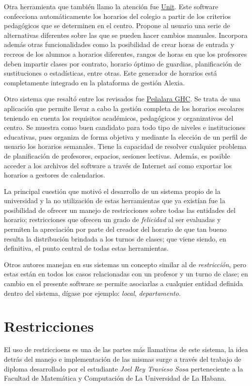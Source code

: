 Otra herramienta que también llamo la atención fue \href{http://www.educaria.es/#horarios2}{Unit}\cite{Unit}. Este software confecciona automáticamente los horarios del colegio a partir de los criterios pedagógicos que se determinen en el centro. Propone al usuario una serie de alternativas diferentes sobre las que se pueden hacer cambios manuales. Incorpora además otras funcionalidades como la posibilidad de crear horas de entrada y recreos de los alumnos a horarios diferentes, rangos de horas en que los profesores deben impartir clases por contrato, horario óptimo de guardias, planificación de sustituciones o estadísticas, entre otras. Este generador de horarios está completamente integrado en la plataforma de gestión Alexia.\cite{Alexia}

Otro sistema que resaltó entre los revisados fue \href{https://www.penalara.com/es/CU}{Peñalara GHC}.\cite{Penalara_GHC} Se trata de una aplicación que permite llevar a cabo la gestión completa de los horarios escolares teniendo en cuenta los requisitos académicos, pedagógicos y organizativos del centro. Se muestra como buen candidato para todo tipo de niveles e instituciones educativas, pues organiza de forma objetiva y mediante la elección de un perfil de usuario los horarios semanales. Tiene la capacidad de resolver cualquier problema de planificación de profesores, espacios, sesiones lectivas. Además, es posible acceder a los archivos del software a través de Internet así como exportar los horarios a gestores de calendarios.

La principal cuestión que motivó el desarrollo de un sistema propio de la universidad y la no utilización de estas herramientas que ya existían fue la posibilidad de ofrecer un manejo de restricciones sobre todas las entidades del horario; restricciones que ofrecen un grado de \emph{felicidad} al ser evaluadas y permiten la apreciación por parte del creador del horario de que tan bueno resulta la distribución brindada a los turnos de clases; que viene siendo, en definitiva, el punto central de todas estas herramientas. 

Otros autores manejan en sus sistemas un concepto similar al de \emph{restricción}, pero estas están en todos los casos relacionadas con un profesor y un turno de clase; en cambio en el presente software se permite asociarlas a cualquier entidad definida dentro del sistema, dígase por ejemplo: \emph{local}, \emph{departamento}.

\section{Restricciones}
\label{state_of_art:restrictions}
El uso de restriccioens es una de las partes más llamativas de este sistema, la idea detrás del manejo e implementación de las mismas surge a través del trabajo de diploma desarrollado por el estudiante \textit{Joel Rey Travieso Sosa} \cite{thesis_joel} perteneciente a la Facultad de Matemática y Computación de La Universidad de La Habana.

